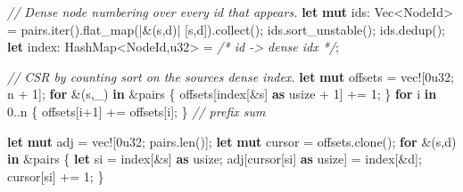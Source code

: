 \documentclass[
  11pt,
  openany]{book}
\newenvironment{Shaded}{}{}
\newcommand{\CommentTok}[1]{\textcolor[rgb]{0.38,0.63,0.69}{\textit{#1}}}
\newcommand{\ControlFlowTok}[1]{\textcolor[rgb]{0.00,0.44,0.13}{\textbf{#1}}}
\newcommand{\DataTypeTok}[1]{\textcolor[rgb]{0.56,0.13,0.00}{#1}}
\newcommand{\DecValTok}[1]{\textcolor[rgb]{0.25,0.63,0.44}{#1}}
\newcommand{\KeywordTok}[1]{\textcolor[rgb]{0.00,0.44,0.13}{\textbf{#1}}}
\newcommand{\NormalTok}[1]{#1}
\newcommand{\OperatorTok}[1]{\textcolor[rgb]{0.40,0.40,0.40}{#1}}
\newcommand{\PreprocessorTok}[1]{\textcolor[rgb]{0.74,0.48,0.00}{#1}}
\begin{document}
\begin{Shaded}
\begin{Highlighting}[]
\CommentTok{// Dense node numbering over every id that appears.}
\KeywordTok{let} \KeywordTok{mut}\NormalTok{ ids}\OperatorTok{:} \DataTypeTok{Vec}\OperatorTok{\textless{}}\NormalTok{NodeId}\OperatorTok{\textgreater{}} \OperatorTok{=}\NormalTok{ pairs}\OperatorTok{.}\NormalTok{iter()}\OperatorTok{.}\NormalTok{flat\_map(}\OperatorTok{|\&}\NormalTok{(s}\OperatorTok{,}\NormalTok{d)}\OperatorTok{|}\NormalTok{ [s}\OperatorTok{,}\NormalTok{d])}\OperatorTok{.}\NormalTok{collect()}\OperatorTok{;}
\NormalTok{ids}\OperatorTok{.}\NormalTok{sort\_unstable()}\OperatorTok{;}\NormalTok{ ids}\OperatorTok{.}\NormalTok{dedup()}\OperatorTok{;}
\KeywordTok{let}\NormalTok{ index}\OperatorTok{:}\NormalTok{ HashMap}\OperatorTok{\textless{}}\NormalTok{NodeId}\OperatorTok{,}\DataTypeTok{u32}\OperatorTok{\textgreater{}} \OperatorTok{=} \CommentTok{/* id {-}\textgreater{} dense idx */}\OperatorTok{;}

\CommentTok{// CSR by counting sort on the source\textquotesingle{}s dense index.}
\KeywordTok{let} \KeywordTok{mut}\NormalTok{ offsets }\OperatorTok{=} \PreprocessorTok{vec!}\NormalTok{[}\DecValTok{0u32}\OperatorTok{;}\NormalTok{ n }\OperatorTok{+} \DecValTok{1}\NormalTok{]}\OperatorTok{;}
\ControlFlowTok{for} \OperatorTok{\&}\NormalTok{(s}\OperatorTok{,}\NormalTok{\_) }\KeywordTok{in} \OperatorTok{\&}\NormalTok{pairs }\OperatorTok{\{}\NormalTok{ offsets[index[}\OperatorTok{\&}\NormalTok{s] }\KeywordTok{as} \DataTypeTok{usize} \OperatorTok{+} \DecValTok{1}\NormalTok{] }\OperatorTok{+=} \DecValTok{1}\OperatorTok{;} \OperatorTok{\}}
\ControlFlowTok{for}\NormalTok{ i }\KeywordTok{in} \DecValTok{0}\OperatorTok{..}\NormalTok{n }\OperatorTok{\{}\NormalTok{ offsets[i}\OperatorTok{+}\DecValTok{1}\NormalTok{] }\OperatorTok{+=}\NormalTok{ offsets[i]}\OperatorTok{;} \OperatorTok{\}}         \CommentTok{// prefix sum}

\KeywordTok{let} \KeywordTok{mut}\NormalTok{ adj }\OperatorTok{=} \PreprocessorTok{vec!}\NormalTok{[}\DecValTok{0u32}\OperatorTok{;}\NormalTok{ pairs}\OperatorTok{.}\NormalTok{len()]}\OperatorTok{;}
\KeywordTok{let} \KeywordTok{mut}\NormalTok{ cursor }\OperatorTok{=}\NormalTok{ offsets}\OperatorTok{.}\NormalTok{clone()}\OperatorTok{;}
\ControlFlowTok{for} \OperatorTok{\&}\NormalTok{(s}\OperatorTok{,}\NormalTok{d) }\KeywordTok{in} \OperatorTok{\&}\NormalTok{pairs }\OperatorTok{\{}
    \KeywordTok{let}\NormalTok{ si }\OperatorTok{=}\NormalTok{ index[}\OperatorTok{\&}\NormalTok{s] }\KeywordTok{as} \DataTypeTok{usize}\OperatorTok{;}
\NormalTok{    adj[cursor[si] }\KeywordTok{as} \DataTypeTok{usize}\NormalTok{] }\OperatorTok{=}\NormalTok{ index[}\OperatorTok{\&}\NormalTok{d]}\OperatorTok{;}
\NormalTok{    cursor[si] }\OperatorTok{+=} \DecValTok{1}\OperatorTok{;}
\OperatorTok{\}}
\end{Highlighting}
\end{Shaded}
\end{document}
